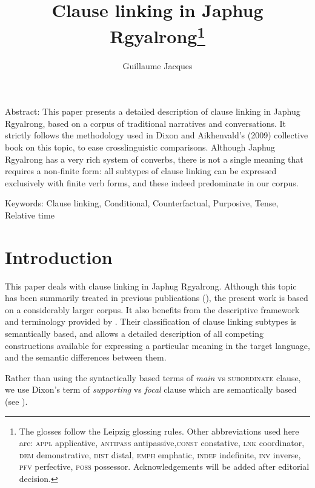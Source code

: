 \documentclass[oldfontcommands,oneside,a4paper,11pt]{article}
\begin{document}
 
\linenumbers
\title{Clause linking in Japhug Rgyalrong\footnote{
The glosses follow the Leipzig glossing rules. Other abbreviations used here are: \textsc{appl} applicative, \textsc{antipass} antipassive,\textsc{const} constative, \textsc{lnk} coordinator, \textsc{dem} demonstrative, \textsc{dist} distal, \textsc{emph} emphatic, \textsc{indef} indefinite, \textsc{inv} inverse,  \textsc{pfv} perfective, \textsc{poss} possessor. %
Acknowledgements will be added after editorial decision.  
} }
\author{Guillaume Jacques}
\maketitle

Abstract: This paper presents a detailed description of clause linking in Japhug Rgyalrong, based on a corpus of traditional narratives and conversations. It strictly follows the methodology used in Dixon and Aikhenvald's (2009) collective book on this topic, to ease crosslinguistic comparisons. Although Japhug Rgyalrong has a very rich system of converbs, there is not a single meaning that requires a non-finite form: all subtypes of clause linking can be expressed exclusively with finite verb forms, and these indeed predominate in our corpus.

Keywords: Clause linking, Conditional, Counterfactual, Purposive, Tense, Relative time 

\section{Introduction}

This paper  deals with clause linking in Japhug Rgyalrong. Although this topic has been summarily treated in previous publications (\citealt[317-325]{jacques08zh}), the present work is based on a considerably larger corpus. It also benefits from the descriptive framework and terminology provided by \citet{dixon09clause.linking}. Their classification of clause linking subtypes is semantically based, and allows a detailed description of all competing constructions available for expressing a particular meaning in the target language, and the semantic differences between them.

Rather than using the syntactically based terms of \textit{main} vs \textsc{subordinate} clause, we use Dixon's term of \textit{supporting}   vs \textit{focal} clause  which are semantically based (see \citealt[2-5]{dixon09intro}).
\end{document}
